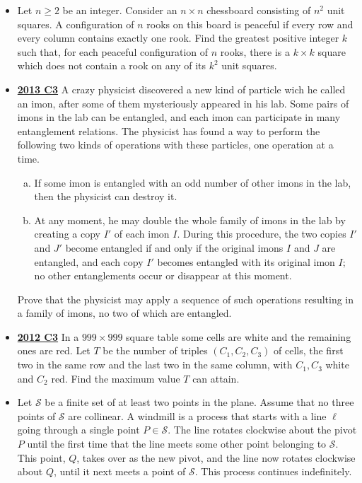 \documentclass[11pt]{scrartcl}
\begin{document}
\begin{itemize}[leftmargin=*]
\item {} 	Let $n \geqslant 2$ be an integer. Consider an $n \times n$ chessboard consisting of $n^2$ unit squares. A configuration of $n$ rooks on this board is peaceful if every row and every column contains exactly one rook. Find the greatest positive integer $k$ such that, for each peaceful configuration of $n$ rooks, there is a $k \times k$ square which does not contain a rook on any of its $k^2$ unit squares. 
\item \href{https://artofproblemsolving.com/community/c6h597130p3543398}{\textbf{2013 C3}} A crazy physicist discovered a new kind of particle wich he called an imon, after some of them mysteriously appeared in his lab. Some pairs of imons in the lab can be entangled, and each imon can participate in many entanglement relations. The physicist has found a way to perform the following two kinds of operations with these particles, one operation at a time.
\begin{enumerate}[(a)]
    \item  If some imon is entangled with an odd number of other imons in the lab, then the physicist can destroy it.
    \item  At any moment, he may double the whole family of imons in the lab by creating a copy $I'$ of each imon $I$. During this procedure, the two copies $I'$ and $J'$ become entangled if and only if the original imons $I$ and $J$ are entangled, and each copy $I'$ becomes entangled with its original imon $I$; no other entanglements occur or disappear at this moment.
\end{enumerate}
Prove that the physicist may apply a sequence of such operations resulting in a family of imons, no two of which are entangled. 
\item \href{https://artofproblemsolving.com/community/c6h546170p3160563}{\textbf{2012 C3}} 	In a $999 \times 999$ square table some cells are white and the remaining ones are red. Let $T$ be the number of triples $(C_1,C_2,C_3)$ of cells, the first two in the same row and the last two in the same column, with $C_1,C_3$ white and $C_2$ red. Find the maximum value $T$ can attain. 
\item {} Let $\mathcal{S}$ be a finite set of at least two points in the plane. Assume that no three points of $\mathcal S$ are collinear. A windmill is a process that starts with a line $\ell$ going through a single point $P \in \mathcal S$. The line rotates clockwise about the pivot $P$ until the first time that the line meets some other point belonging to $\mathcal S$. This point, $Q$, takes over as the new pivot, and the line now rotates clockwise about $Q$, until it next meets a point of $\mathcal S$. This process continues indefinitely.

\end{itemize}
\end{document}

